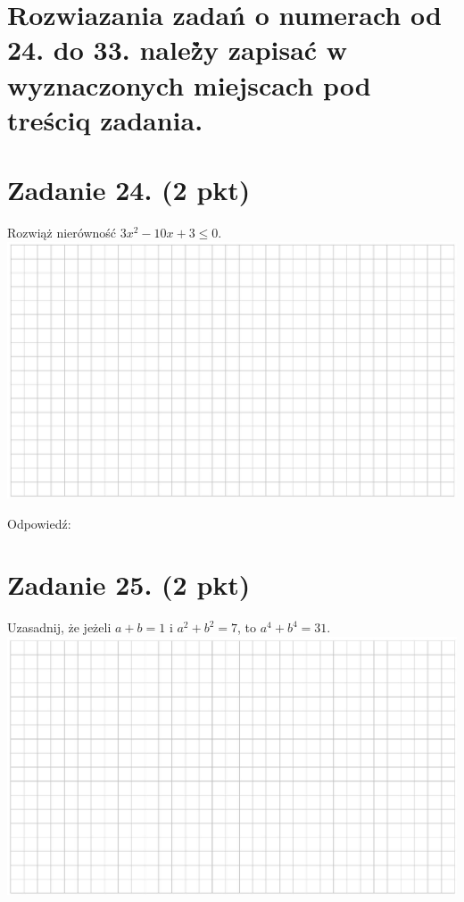\documentclass[10pt]{article}
\begin{document}
\section*{Rozwiazania zadań o numerach od 24. do 33. należ̀y zapisać w wyznaczonych miejscach pod treściq zadania.}
\section*{Zadanie 24. (2 pkt)}
Rozwiąż nierówność \(3 x^{2}-10 x+3 \leq 0\).\\
\includegraphics[max width=\textwidth, center]{2024_11_21_5b6b7ffa9006e3f448adg-10(1)}

Odpowiedź:

\section*{Zadanie 25. (2 pkt)}
Uzasadnij, że jeżeli \(a+b=1\) i \(a^{2}+b^{2}=7\), to \(a^{4}+b^{4}=31\).\\
\includegraphics[max width=\textwidth, center]{2024_11_21_5b6b7ffa9006e3f448adg-10}
\end{document}
